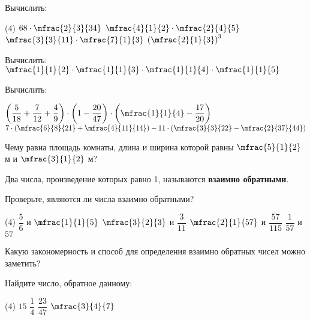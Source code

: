 %
%
%
%
\begin{class}[number=1]
	\begin{listofex}
		\item Вычислить:
		\begin{tasks}(4)
			\task \( 68\cdot\mfrac{2}{3}{34} \)
			\task \( \mfrac{4}{1}{2}\cdot\mfrac{2}{4}{5} \)
			\task \( \mfrac{3}{3}{11}\cdot\mfrac{7}{1}{3} \)
			\task \( \left( \mfrac{2}{1}{3} \right)^3 \)
		\end{tasks}
		\item Вычислить: \( \mfrac{1}{1}{2}\cdot\mfrac{1}{1}{3}\cdot\mfrac{1}{1}{4}\cdot\mfrac{1}{1}{5} \)
		\item Вычислить: 
		\begin{tasks}
			\task \( \left( \dfrac{5}{18}+\dfrac{7}{12}+\dfrac{4}{9} \right)\cdot\left( 1-\dfrac{20}{47} \right)\cdot\left( \mfrac{1}{1}{4}-\dfrac{17}{20} \right) \)
			\task \( 7\cdot\left( \mfrac{6}{8}{21}+\mfrac{4}{11}{14} \right)-11\cdot\left( \mfrac{3}{3}{22}-\mfrac{2}{37}{44} \right) \)
		\end{tasks}
		\item Чему равна площадь комнаты, длина и ширина которой равны \( \mfrac{5}{1}{2} \) м и \( \mfrac{3}{1}{2} \) м?
	\end{listofex}
	\begin{definit}
		Два числа, произведение которых равно 1, называются \textbf{взаимно обратными}.
	\end{definit}
	\begin{listofex}[resume]
	\item Проверьте, являются ли числа взаимно обратными?
	\begin{tasks}(4)
		\task \( \dfrac{5}{6} \) и \( \mfrac{1}{1}{5} \)
		\task \( \mfrac{3}{2}{3} \) и \( \dfrac{3}{11} \)
		\task \( \mfrac{2}{1}{57} \) и \( \dfrac{57}{115} \)
		\task \( \dfrac{1}{57} \) и \( 57 \)
	\end{tasks}
	Какую закономерность и способ для определения взаимно обратных чисел можно заметить?
	\item Найдите число, обратное данному:
	\begin{tasks}(4)
		\task \( 15 \)
		\task \( \dfrac{1}{4} \)
		\task \( \dfrac{23}{47} \)
		\task \( \mfrac{3}{4}{7} \)
	\end{tasks}
	\end{listofex}
\end{class}
